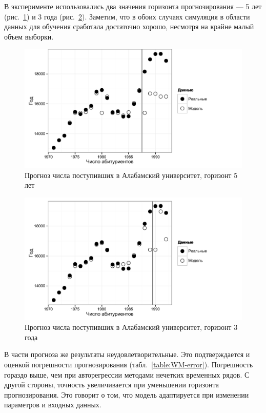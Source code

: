В эксперименте использовались два значения горизонта прогнозирования --- 5 лет (рис.~\ref{figure:UA_model_h=5}) и 3 года (рис.~\ref{figure:UA_model_h=3}). Заметим, что в обоих случаях симуляция в области данных для обучения сработала достаточно хорошо, несмотря на крайне малый объем выборки. 

\begin{figure}[bhtp]
    \includegraphics{images/UA_model_h=5.pdf}
    \caption{Прогноз числа поступивших в Алабамский университет, \newline горизонт 5 лет}		
    \label{figure:UA_model_h=5}
\end{figure}

\begin{figure}[bhtp]
    \includegraphics{images/UA_model_h=3.pdf}
    \caption{Прогноз числа поступивших в Алабамский университет, \newline горизонт 3 года}		
    \label{figure:UA_model_h=3}
\end{figure}

В части прогноза же результаты неудовлетворительные. Это подтверждается и оценкой погрешности прогнозирования (табл.~\ref{table:WM-error}). Погрешность гораздо выше, чем при авторегрессии методами нечетких временных рядов. С другой стороны, точность увеличивается при уменьшении горизонта прогнозирования. Это говорит о том, что модель адаптируется при изменении параметров и входных данных. 

